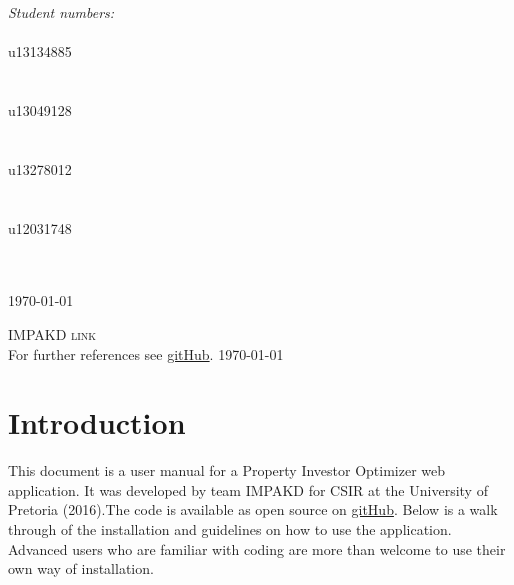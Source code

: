 \documentclass[a4paper,12pt]{article}
\begin{document}
\begin{titlepage}
\begin{center}
\begin{minipage}{0.4\textwidth}
\begin{flushright}
\emph{ \Large Student numbers:} \\[0.4cm]  
\emph{}\\
{\Large u13134885}\\
\emph{}\\
\emph{}\\
{\Large u13049128}\\
\emph{}\\
\emph{}\\
{\Large u13278012}\\
\emph{}\\
\emph{}\\
{\Large u12031748}\\
\emph{}\\
\emph{}\\

\end{flushright}
\end{minipage}


{\large \today}
\end{center}
\end{titlepage}
\renewcommand{\thesection}{\arabic{section}}

\newpage
\begin{center}
\textsc{\Large IMPAKD link}\\[0.5cm]
For further references see \href{https://github.com/u13278012/IMPAKD/}{gitHub}.
\today
\end{center}
\newpage
\tableofcontents{}

\newpage 
\section{Introduction}
This document is a user manual for a Property Investor Optimizer web application. It was developed by team IMPAKD for CSIR at the University of Pretoria (2016).The code is available as open source on \href{https://github.com/u13278012/IMPAKD/}{gitHub}. Below is a walk through of the installation and guidelines on how to use the application. Advanced users who are familiar with coding are more than welcome to use their own way of installation. 
\end{document}
